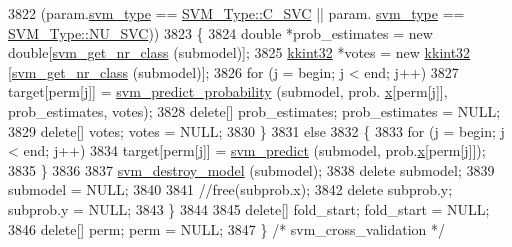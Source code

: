 \begin{DoxyCode}
3822        (param.\hyperlink{struct_s_v_m289___b_f_s_1_1svm__parameter_a670b1be49bd630113fbf92dce2ebd9c4}{svm\_type} == \hyperlink{namespace_s_v_m233_acde4c278f323c82a6b41c27f6f30738aa942f03bda3ae7dbb9e945f161c95ab97}{SVM\_Type::C\_SVC} || param.
      \hyperlink{struct_s_v_m289___b_f_s_1_1svm__parameter_a670b1be49bd630113fbf92dce2ebd9c4}{svm\_type} == \hyperlink{namespace_s_v_m233_acde4c278f323c82a6b41c27f6f30738aa7705bf71b9d3c7169b4d201acb2b30b8}{SVM\_Type::NU\_SVC}))
3823     \{
3824       \textcolor{keywordtype}{double} *prob\_estimates = \textcolor{keyword}{new} \textcolor{keywordtype}{double}[\hyperlink{svm_8cpp_a8899c9bff7d0e5d840e33a6c66eec1cd}{svm\_get\_nr\_class} (submodel)];
3825       \hyperlink{namespace_k_k_b_a8fa4952cc84fda1de4bec1fbdd8d5b1b}{kkint32}  *votes          = \textcolor{keyword}{new} \hyperlink{namespace_k_k_b_a8fa4952cc84fda1de4bec1fbdd8d5b1b}{kkint32} [\hyperlink{svm_8cpp_a8899c9bff7d0e5d840e33a6c66eec1cd}{svm\_get\_nr\_class} (submodel)];
3826       \textcolor{keywordflow}{for}  (j = begin;  j < end;  j++)
3827         target[perm[j]] = \hyperlink{namespace_s_v_m289___m_f_s_ac0623d29bd02989f751e50d1cb3c8855}{svm\_predict\_probability} (submodel, prob.
      \hyperlink{struct_s_v_m289___b_f_s_1_1svm__problem_a41858dbcf26913311ad17674d9eb42a8}{x}[perm[j]], prob\_estimates, votes);
3828       \textcolor{keyword}{delete}[]  prob\_estimates;  prob\_estimates = NULL;
3829       \textcolor{keyword}{delete}[]  votes;           votes          = NULL;
3830     \}
3831     \textcolor{keywordflow}{else}
3832     \{
3833       \textcolor{keywordflow}{for}  (j = begin;  j < end;  j++)
3834         target[perm[j]] = \hyperlink{namespace_s_v_m233_a7f194ec68b77ae5069b5a601d3870371}{svm\_predict} (submodel, prob.\hyperlink{struct_s_v_m289___b_f_s_1_1svm__problem_a41858dbcf26913311ad17674d9eb42a8}{x}[perm[j]]);
3835     \}
3836 
3837     \hyperlink{namespace_s_v_m233_ae4315496ae1099c8ec84268ccf7b5d14}{svm\_destroy\_model} (submodel);
3838     \textcolor{keyword}{delete}  submodel;
3839     submodel = NULL;
3840 
3841     \textcolor{comment}{//free(subprob.x);}
3842     \textcolor{keyword}{delete}  subprob.y;   subprob.y = NULL;
3843   \}    
3844 
3845   \textcolor{keyword}{delete}[] fold\_start;  fold\_start = NULL;
3846   \textcolor{keyword}{delete}[] perm;        perm       = NULL;
3847 \}  \textcolor{comment}{/* svm\_cross\_validation */}
\end{DoxyCode}
